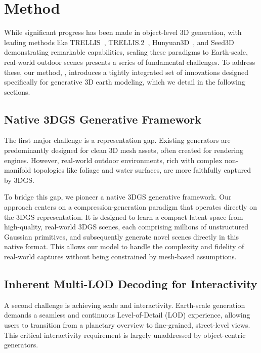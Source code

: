 \section{Method}
\label{sec3}

While significant progress has been made in object-level 3D generation, with leading methods like TRELLIS~\cite{xiang2025structured}, TRELLIS.2~\cite{xiang2025native}, Hunyuan3D~\cite{lai2025hunyuan3d25highfidelity3d,hunyuan3d22025tencent,yang2024hunyuan3d}, and Seed3D~\cite{Seed3D} demonstrating remarkable capabilities, scaling these paradigms to Earth-scale, real-world outdoor scenes presents a series of fundamental challenges. To address these, our method, \method{}, introduces a tightly integrated set of innovations designed specifically for generative 3D earth modeling, which we detail in the following sections.

\subsection{Native 3DGS Generative Framework}
\label{sec:3dgs_framework}

The first major challenge is a {representation gap}. Existing generators are predominantly designed for clean 3D mesh assets, often created for rendering engines. However, real-world outdoor environments, rich with complex non-manifold topologies like foliage and water surfaces, are more faithfully captured by 3DGS.

To bridge this gap, we pioneer a native 3DGS generative framework. Our approach centers on a compression-generation paradigm that operates directly on the 3DGS representation. It is designed to learn a compact latent space from high-quality, real-world 3DGS scenes, each comprising millions of unstructured Gaussian primitives, and subsequently generate novel scenes directly in this native format. This allows our model to handle the complexity and fidelity of real-world captures without being constrained by mesh-based assumptions.

\subsection{Inherent Multi-LOD Decoding for Interactivity}
\label{sec:lod_decoder}

A second challenge is achieving {scale and interactivity}. Earth-scale generation demands a seamless and continuous Level-of-Detail (LOD) experience, allowing users to transition from a planetary overview to fine-grained, street-level views. This critical interactivity requirement is largely unaddressed by object-centric generators.

